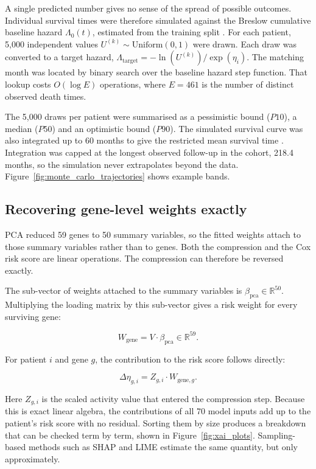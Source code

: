 \documentclass[10pt,a4paper]{article}
\begin{document}
A single predicted number gives no sense of the spread of possible outcomes.
Individual survival times were therefore simulated against the Breslow
cumulative baseline hazard $\Lambda_0(t)$, estimated from the training split
\citep{breslow1972discussion}. For each patient, 5,000 independent values
$U^{(k)} \sim \mathrm{Uniform}(0, 1)$ were drawn. Each draw was converted to a
target hazard, $\Lambda_{\text{target}} = -\ln(U^{(k)}) / \exp(\eta_i)$. The
matching month was located by binary search over the baseline hazard step
function. That lookup costs $O(\log E)$ operations, where $E = 461$ is the number
of distinct observed death times.

The 5,000 draws per patient were summarised as a pessimistic bound ($P10$), a
median ($P50$) and an optimistic bound ($P90$). The simulated survival curve was
also integrated up to 60 months to give the restricted mean survival time
\citep{royston2013restricted}. Integration was capped at the longest observed
follow-up in the cohort, 218.4 months, so the simulation never extrapolates
beyond the data. Figure~\ref{fig:monte_carlo_trajectories} shows example bands.

\subsection{Recovering gene-level weights exactly}

PCA reduced 59 genes to 50 summary variables, so the fitted weights attach to
those summary variables rather than to genes. Both the compression and the Cox
risk score are linear operations. The compression can therefore be reversed
exactly.

The sub-vector of weights attached to the summary variables is
$\beta_{\text{pca}} \in \mathbb{R}^{50}$. Multiplying the loading matrix by this
sub-vector gives a risk weight for every surviving gene:

\begin{equation}
W_{\text{gene}} = V \cdot \beta_{\text{pca}} \in \mathbb{R}^{59}.
\end{equation}

For patient $i$ and gene $g$, the contribution to the risk score follows
directly:

\begin{equation}
\Delta \eta_{g,i} = Z_{g,i} \cdot W_{\text{gene},g}.
\end{equation}

Here $Z_{g,i}$ is the scaled activity value that entered the compression step.
Because this is exact linear algebra, the contributions of all 70 model inputs
add up to the patient's risk score with no residual. Sorting them by size
produces a breakdown that can be checked term by term, shown in
Figure~\ref{fig:xai_plots}. Sampling-based methods such as SHAP
\citep{lundberg2017unified} and LIME \citep{ribeiro2016why} estimate the same
quantity, but only approximately.
\end{document}
